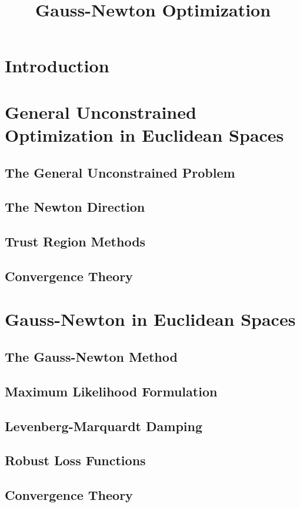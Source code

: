 \documentclass{amsart}
\title{Gauss-Newton Optimization}
\begin{document}
\maketitle

\tableofcontents

\section{Introduction}

\section{General Unconstrained Optimization in Euclidean Spaces}
\subsection{The General Unconstrained Problem}
\subsection{The Newton Direction}
\subsection{Trust Region Methods}
\subsection{Convergence Theory}

\section{Gauss-Newton in Euclidean Spaces}
\subsection{The Gauss-Newton Method}
\subsection{Maximum Likelihood Formulation}
\subsection{Levenberg-Marquardt Damping}
\subsection{Robust Loss Functions}
\subsection{Convergence Theory}
\end{document}
